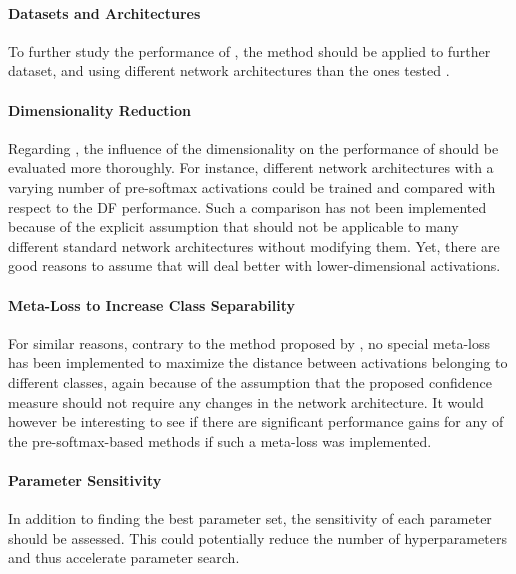 \documentclass[10pt]{article}
\begin{document}
\paragraph{Datasets and Architectures} To further study the performance of , the method should be applied to further dataset, and using different network architectures than the ones tested \cite{ronneberger2015u,Berkeley2015HypercolumnsFO}.

\paragraph{Dimensionality Reduction} Regarding , the influence of the dimensionality on the performance of  should be evaluated more thoroughly. For instance, different network architectures with a varying number of pre-softmax activations could be trained and compared with respect to the \acrlong{DF} performance. Such a comparison has not been implemented because of the explicit assumption that  should not be applicable to many different standard network architectures without modifying them. Yet, there are good reasons to assume that  will deal better with lower-dimensional activations.

\paragraph{Meta-Loss to Increase Class Separability} For similar reasons, contrary to the method proposed by \textcite{mandelbaum17}, no special meta-loss has been implemented to maximize the distance between activations belonging to different classes, again because of the assumption that the proposed confidence measure should not require any changes in the network architecture. It would however be interesting to see if there are significant performance gains for any of the pre-softmax-based methods if such a meta-loss was implemented. 

\paragraph{Parameter Sensitivity} In addition to finding the best parameter set, the sensitivity of each parameter should be assessed. This could potentially reduce the number of hyperparameters and thus accelerate parameter search.

\end{document}
